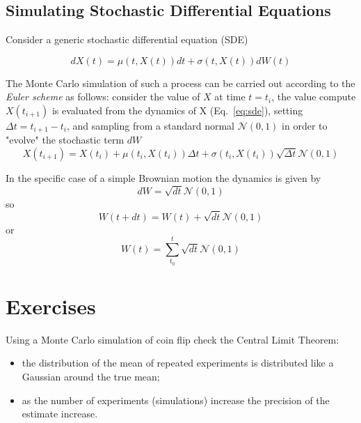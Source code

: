 \documentclass[12pt,a4paper]{book}
\begin{document}
\subsection{Simulating Stochastic Differential Equations}

Consider a generic stochastic differential equation (SDE)

\begin{equation}
dX(t) = \mu(t,X(t))dt + \sigma(t,X(t))dW(t)
\label{eq:sde}
\end{equation}

The Monte Carlo simulation of such a process can be carried out according to the \emph{Euler scheme} as follows: consider the value of $X$ at time $t=t_i$, the value compute $X(t_{i+1})$ is evaluated from the dynamics of X (Eq.~\ref{eq:sde}), setting $\Delta t = t_{i+1} - t_{i}$, and sampling from a standard normal $\mathcal{N}(0,1)$ in order to "evolve" the stochastic term $dW$
\begin{equation}
X(t_{i+1}) = X(t_i) + \mu(t_i,X(t_i))\Delta t + \sigma(t_i,X(t_i))\sqrt{\Delta t}\mathcal{N}(0,1)
\end{equation}

In the specific case of a simple Brownian motion the dynamics is given by
\begin{equation}
dW = \sqrt{dt}\mathcal{N}(0,1)
\end{equation}
so
\begin{equation}
W(t+dt) = W(t) + \sqrt{dt}\mathcal{N}(0,1)
\end{equation}
or
\begin{equation}
W(t) = \sum_{t_0}^{t} \sqrt{dt}\mathcal{N}(0,1)
\end{equation}

\section*{Exercises}
\begin{exercise}[subtitle={Central Limit Theorem  (\texttt{python})}]
Using a Monte Carlo simulation of coin flip check the Central Limit Theorem:
\begin{itemize}
\item the distribution of the mean of repeated experiments is distributed like a Gaussian around the true mean;
\item as the number of experiments (simulations) increase the precision of the estimate increase.
\end{itemize}
\end{exercise}
\end{document}
